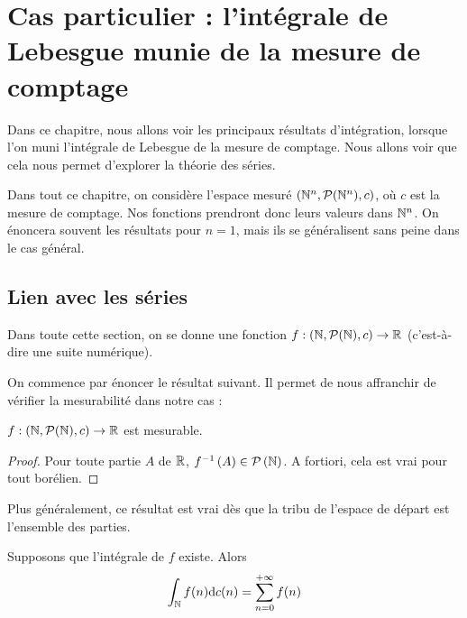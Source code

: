\documentclass[../integ-proba.tex]{subfiles}
\begin{document}
    \chapter{Cas particulier : l'intégrale de Lebesgue munie de la mesure de comptage}
    \label{ch:series}

    Dans ce chapitre, nous allons voir les principaux résultats d'intégration, lorsque l'on muni l'intégrale de Lebesgue de la mesure de comptage.
    Nous allons voir que cela nous permet d'explorer la théorie des séries.

    Dans tout ce chapitre, on considère l'espace mesuré $\left(\mathbb{N}^n, \mathcal{P}(\mathbb{N}^n), c\right)$, où $c$ est la mesure de comptage.
    Nos fonctions prendront donc leurs valeurs dans $\mathbb{N}^n$.
    On énoncera souvent les résultats pour $n=1$, mais ils se généralisent sans peine dans le cas général.

    \section{Lien avec les séries}

    Dans toute cette section, on se donne une fonction $f:\left(\mathbb{N}, \mathcal{P}(\mathbb{N}), c\right) \rightarrow \mathbb{R}$ (c'est-à-dire une suite numérique).

    On commence par énoncer le résultat suivant.
    Il permet de nous affranchir de vérifier la mesurabilité dans notre cas :

    \begin{prop}
        $f:\left(\mathbb{N}, \mathcal{P}(\mathbb{N}), c\right) \rightarrow \mathbb{R}$ est mesurable.
    \end{prop}

    \begin{proof}
        Pour toute partie $A$ de $\mathbb{R}$, $f^{-1}\left(A\right) \in \mathcal{P}\left(\mathbb{N}\right)$.
        A fortiori, cela est vrai pour tout borélien.
    \end{proof}

    \begin{rem}
        Plus généralement, ce résultat est vrai dès que la tribu de l'espace de départ est l'ensemble des parties.
    \end{rem}

    \begin{thm}
        \label{thm:lien_series}
        Supposons que l'intégrale de $f$ existe.
        Alors
        \begin{displaymath}
            \int_{\mathbb{N}} f(n)\textnormal{d}c(n) = \sum_{n=0}^{+\infty} f(n)
        \end{displaymath}
    \end{thm}
\end{document}

